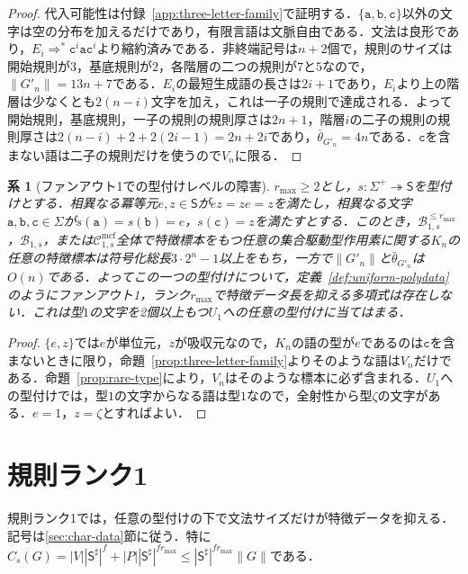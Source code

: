 \documentclass[11pt,a4paper]{ltjsarticle}
\numberwithin{equation}{section}
\theoremstyle{plain}
\newtheorem{corollary}[theorem]{系}
\theoremstyle{definition}
\theoremstyle{remark}
\newcommand{\Cmcf}[2]{\mathcal{C}^{\mathrm{mcf}}_{#1,#2}}
\begin{document}
\begin{proof}
代入可能性は付録~\ref{app:three-letter-family}で証明する．$\{\mathtt a,\mathtt b,\mathtt c\}$以外の文字は空の分布を加えるだけであり，有限言語は文脈自由である．文法は良形であり，$E_i\Rightarrow^*\mathtt c^i\mathtt a\mathtt c^i$より縮約済みである．非終端記号は$n+2$個で，規則のサイズは開始規則が$3$，基底規則が$2$，各階層の二つの規則が$7$と$5$なので，$\|G'_n\|=13n+7$である．$E_i$の最短生成語の長さは$2i+1$であり，$E_i$より上の階層は少なくとも$2(n-i)$文字を加え，これは一子の規則で達成される．よって開始規則，基底規則，一子の規則の規則厚さは$2n+1$，階層$i$の二子の規則の規則厚さは$2(n-i)+2+2(2i-1)=2n+2i$であり，$\bar\theta_{G'_n}=4n$である．$\mathtt c$を含まない語は二子の規則だけを使うので$V_n$に限る．
\end{proof}

\begin{corollary}[ファンアウト1での型付けレベルの障害]
\label{cor:typing-level-obstruction}
$r_{\max}\ge2$とし，$s:\Sigma^+\twoheadrightarrow\mathsf S$を型付けとする．相異なる冪等元$e,z\in\mathsf S$が$ez=ze=z$を満たし，相異なる文字$\mathtt a,\mathtt b,\mathtt c\in\Sigma$が$s(\mathtt a)=s(\mathtt b)=e$，$s(\mathtt c)=z$を満たすとする．このとき，$\mathcal B^{\le r_{\max}}_{1,s}$，$\mathcal B_{1,s}$，または$\Cmcf{1}{s}$全体で特徴標本をもつ任意の集合駆動型作用素に関する$K_n$の任意の特徴標本は符号化総長$3\cdot2^n-1$以上をもち，一方で$\|G'_n\|$と$\bar\theta_{G'_n}$は$O(n)$である．よってこの一つの型付けについて，定義~\ref{def:uniform-polydata}のようにファンアウト1，ランク$r_{\max}$で特徴データ長を抑える多項式は存在しない．これは型$1$の文字を2個以上もつ$U_1$への任意の型付けに当てはまる．
\end{corollary}

\begin{proof}
$\{e,z\}$では$e$が単位元，$z$が吸収元なので，$K_n$の語の型が$e$であるのは$\mathtt c$を含まないときに限り，命題~\ref{prop:three-letter-family}よりそのような語は$V_n$だけである．命題~\ref{prop:rare-type}により，$V_n$はそのような標本に必ず含まれる．$U_1$への型付けでは，型$1$の文字からなる語は型$1$なので，全射性から型$\zeta$の文字がある．$e=1$，$z=\zeta$とすればよい．
\end{proof}

\section{規則ランク1}
\label{sec:further}
\label{subsec:rank-one}

規則ランク1では，任意の型付けの下で文法サイズだけが特徴データを抑える．記号は\ref{sec:char-data}節に従う．特に$C_s(G)=|V||\mathsf S^\sharp|^f+|P||\mathsf S^\sharp|^{fr_{\max}}\le|\mathsf S^\sharp|^{fr_{\max}}\|G\|$である．
\end{document}
